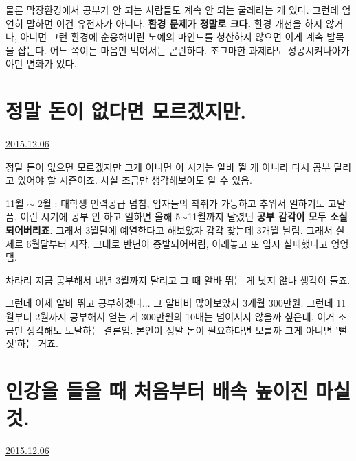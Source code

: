 물론 막장환경에서 공부가 안 되는 사람들도 계속 안 되는 굴레라는 게 있다.
그런데 엄연히 말하면 이건 유전자가 아니다. \textbf{환경 문제가 정말로 크다.}
환경 개선을 하지 않거나, 아니면 그런 환경에 순응해버린 노예의 마인드를 청산하지 않으면 이게 계속 발목을 잡는다.
어느 쪽이든 마음만 먹어서는 곤란하다. 조그마한 과제라도 성공시켜나아가야만 변화가 있다.
\vspace{5mm}





\section{정말 돈이 없다면 모르겠지만.}
\href{https://www.kockoc.com/Apoc/530358}{2015.12.06}

\vspace{5mm}

정말 돈이 없으면 모르겠지만 그게 아니면 이 시기는 알바 뛸 게 아니라 다시 공부 달리고 있어야 할 시즌이죠.
사실 조금만 생각해보아도 알 수 있음.
\vspace{5mm}

11월 $\sim$ 2월 : 대학생 인력공급 넘침, 업자들의 착취가 가능하고 추워서 일하기도 고달픔.
이런 시기에 공부 안 하고 일하면 올해 5$\sim$11월까지 달렸던 \textbf{공부 감각이 모두 소실되어버리죠}.
그래서 3월달에 예열한다고 해보았자 감각 찾는데 3개월 날림.
그래서 실제로 6월달부터 시작. 그대로 반년이 증발되어버림, 이래놓고 또 입시 실패했다고 엉엉댐.
\vspace{5mm}

차라리 지금 공부해서 내년 3월까지 달리고 그 때 알바 뛰는 게 낫지 않나 생각이 들죠.
\vspace{5mm}

그런데 이제 알바 뛰고 공부하겠다... 그 알바비 많아보았자 3개월 300만원.
그런데 11월부터 2월까지 공부해서 얻는 게 300만원의 10배는 넘어서지 않을까 싶은데.
이거 조금만 생각해도 도달하는 결론임. 본인이 정말 돈이 필요하다면 모를까 그게 아니면 '뻘짓'하는 거죠.
\vspace{5mm}





\section{인강을 들을 때 처음부터 배속 높이진 마실 것.}
\href{https://www.kockoc.com/Apoc/530936}{2015.12.06}

\vspace{5mm}

